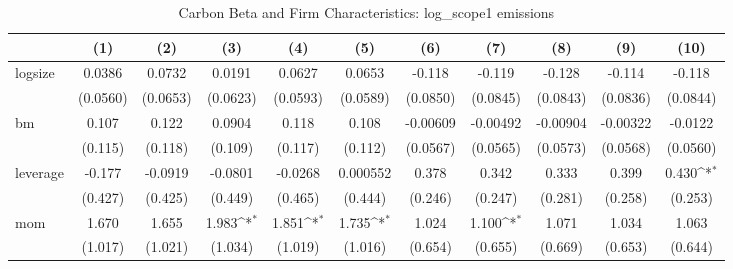 \begin{table}[htbp]\centering
\def\sym#1{\ifmmode^{#1}\else\(^{#1}\)\fi}
\caption{Carbon Beta and Firm Characteristics: log\_scope1 emissions}
\begin{tabular}{l*{10}{c}}
\hline\hline
                &\multicolumn{1}{c}{(1)}         &\multicolumn{1}{c}{(2)}         &\multicolumn{1}{c}{(3)}         &\multicolumn{1}{c}{(4)}         &\multicolumn{1}{c}{(5)}         &\multicolumn{1}{c}{(6)}         &\multicolumn{1}{c}{(7)}         &\multicolumn{1}{c}{(8)}         &\multicolumn{1}{c}{(9)}         &\multicolumn{1}{c}{(10)}         \\
\hline
logsize         &   0.0386         &   0.0732         &   0.0191         &   0.0627         &   0.0653         &   -0.118         &   -0.119         &   -0.128         &   -0.114         &   -0.118         \\
                & (0.0560)         & (0.0653)         & (0.0623)         & (0.0593)         & (0.0589)         & (0.0850)         & (0.0845)         & (0.0843)         & (0.0836)         & (0.0844)         \\
[1em]
bm              &    0.107         &    0.122         &   0.0904         &    0.118         &    0.108         & -0.00609         & -0.00492         & -0.00904         & -0.00322         &  -0.0122         \\
                &  (0.115)         &  (0.118)         &  (0.109)         &  (0.117)         &  (0.112)         & (0.0567)         & (0.0565)         & (0.0573)         & (0.0568)         & (0.0560)         \\
[1em]
leverage        &   -0.177         &  -0.0919         &  -0.0801         &  -0.0268         & 0.000552         &    0.378         &    0.342         &    0.333         &    0.399         &    0.430\sym{*}  \\
                &  (0.427)         &  (0.425)         &  (0.449)         &  (0.465)         &  (0.444)         &  (0.246)         &  (0.247)         &  (0.281)         &  (0.258)         &  (0.253)         \\
[1em]
mom             &    1.670         &    1.655         &    1.983\sym{*}  &    1.851\sym{*}  &    1.735\sym{*}  &    1.024         &    1.100\sym{*}  &    1.071         &    1.034         &    1.063         \\
                &  (1.017)         &  (1.021)         &  (1.034)         &  (1.019)         &  (1.016)         &  (0.654)         &  (0.655)         &  (0.669)         &  (0.653)         &  (0.644)         \\

\end{tabular}
\end{table}
